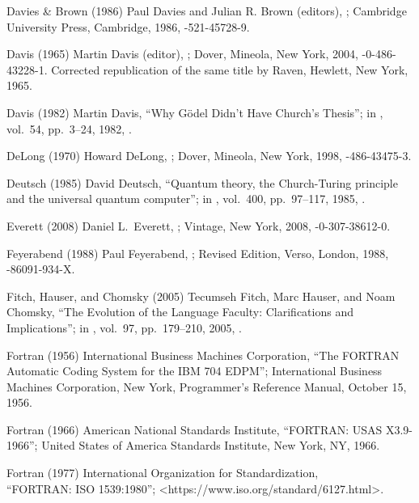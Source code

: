  Davies \& Brown (1986)
Paul Davies and Julian R. Brown (editors),
;
Cambridge University Press, Cambridge, 1986,
-521-45728-9.

 Davis (1965)
Martin Davis (editor),
;
Dover, Mineola, New York, 2004,
-0-486-43228-1.
Corrected republication of the same title
by Raven, Hewlett, New York, 1965.

 Davis (1982)
Martin Davis,
``Why G\"odel Didn't Have Church's Thesis'';
in ,
vol.\ 54, pp.\ 3--24, 1982,
.

 DeLong (1970)
Howard DeLong,
;
Dover, Mineola, New York, 1998,
-486-43475-3.

 Deutsch (1985)
David Deutsch,
``Quantum theory, the Church-Turing principle and
  the universal quantum computer'';
in ,
 vol.\ 400, pp.\ 97--117, 1985,
.

 Everett (2008)
Daniel L.\ Everett,
;
Vintage, New York, 2008,
-0-307-38612-0.

 Feyerabend (1988)
Paul Feyerabend,
;
Revised Edition, Verso, London, 1988,
-86091-934-X.

  Fitch, Hauser, and Chomsky (2005)
Tecumseh Fitch, Marc Hauser, and Noam Chomsky,
``The Evolution of the Language Faculty:
Clarifications and Implications'';
in ,
vol.\ 97, pp.\ 179--210, 2005,
.

 Fortran (1956)
International Business Machines Corporation,
``The FORTRAN Automatic Coding System for the IBM 704 EDPM'';
International Business Machines Corporation, New York,
Programmer's Reference Manual, October 15, 1956.

 Fortran (1966)
American National Standards Institute,
``FORTRAN: USAS X3.9-1966'';
United States of America Standards Institute, New York, NY, 1966.

 Fortran (1977)
International Organization for Standardization,\\
``FORTRAN: ISO 1539:1980'';
\URL<https://www.iso.org/standard/6127.html>.


